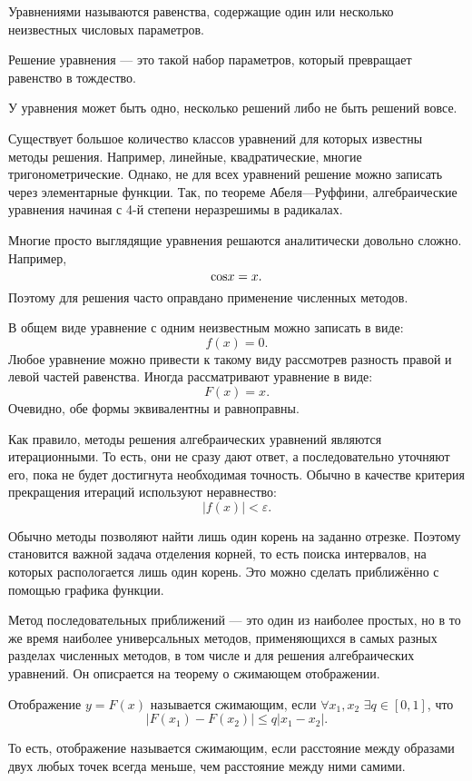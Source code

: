 

\Theory

\begin{defn}
Уравнениями называются равенства, содержащие один или несколько
неизвестных числовых параметров.
\end{defn}

\begin{defn}
  Решение уравнения — это такой набор параметров, который превращает
  равенство в тождество.
\end{defn}

У уравнения может быть одно, несколько решений либо не быть решений
вовсе.

Существует большое количество классов уравнений для которых известны
методы решения. Например, линейные, квадратические, многие
тригонометрические.  Однако, не для всех уравнений решение можно
записать через элементарные функции. Так, по теореме Абеля—Руффини,
алгебраические уравнения начиная с 4-й степени неразрешимы в
радикалах.

Многие просто выглядящие уравнения решаются аналитически довольно
сложно. Например,
\[
\text{\ensuremath{\cos}}x=x.
\]
Поэтому для решения часто оправдано применение численных методов.

В общем виде уравнение с одним неизвестным можно записать в виде:
\[
f(x)=0.
\]
Любое уравнение можно привести к такому виду рассмотрев разность
правой и левой частей равенства. Иногда рассматривают уравнение в
виде:
\[
F(x)=x.
\]
Очевидно, обе формы эквивалентны и равноправны.

Как правило, методы решения алгебраических уравнений являются
итерационными.  То есть, они не сразу дают ответ, а последовательно
уточняют его, пока не будет достигнута необходимая точность. Обычно в
качестве критерия прекращения итераций используют неравнество:
\[
|f(x)|<\varepsilon.
\]


Обычно методы позволяют найти лишь один корень на заданно отрезке.
Поэтому становится важной задача отделения корней, то есть поиска
интервалов, на которых распологается лишь один корень. Это можно
сделать приближённо с помощью графика функции.



Метод последовательных приближений — это один из наиболее простых, но
в то же время наиболее универсальных методов, применяющихся в самых
разных разделах численных методов, в том числе и для решения
алгебраических уравнений. Он описрается на теорему о сжимающем
отображении.
\begin{defn}
Отображение $y=F(x)$ называется сжимающим, если $\forall x_{1},x_{2}$
$\exists q\in[0,1]$, что
\[
|F(x_{1})-F(x_{2})|\leqslant q|x_{1}-x_{2}|.
\]

\end{defn}
То есть, отображение называется сжимающим, если расстояние между
образами двух любых точек всегда меньше, чем расстояние между ними
самими.

